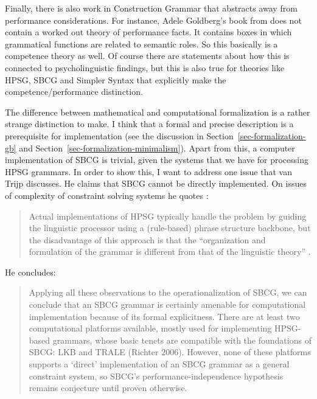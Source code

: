 Finally, there is also work in Construction Grammar that abstracts away from performance
considerations. For instance, Adele Goldberg's book from \citeyear{Goldberg95a} does
not contain a worked out theory of performance facts. It contains boxes in which grammatical
functions are related to semantic roles. So this basically is a competence theory as well. Of course
there are statements about how this is connected to psycholinguistic findings, but this is also true
for theories like HPSG, SBCG and Simpler Syntax \citep[]{Jackendoff2011a} that explicitly make the competence/performance distinction.


The difference between mathematical and computational formalization is a rather strange distinction to make. I
think that a formal and precise description is a prerequisite for implementation (see the discussion
in Section~\ref{sec-formalization-gb} and Section~\ref{sec-formalization-minimalism}). Apart from this, a computer implementation of SBCG is
trivial, given the systems that we have for processing HPSG grammars. In order to show this, I want
to address one issue that van Trijp discusses. He claims that SBCG cannot be directly
implemented. On issues of complexity of constraint solving systems he quotes \citep[Section~4.2.2]{LM2006a}:
\begin{quote}
Actual implementations of HPSG typically handle the problem by guiding the linguistic processor
using a (rule-based) phrase structure backbone, but the disadvantage of this approach is that the ``organization and formulation of the grammar is different from
that of the linguistic theory'' \citep[Section~4.2.2]{LM2006a}. \citep[]{vanTrijp2013a}
\end{quote}
\largerpage
He concludes:
\begin{quote}
Applying all these observations to the operationalization of SBCG, we can
conclude that an SBCG grammar is certainly amenable for computational implementation because of its formal explicitness. There are at least two computational
platforms available, mostly used for implementing HPSG-based grammars, whose
basic tenets are compatible with the foundations of SBCG: LKB \citep{Copestake2002a}
and TRALE (Richter 2006). However, none of these platforms supports a `direct'
implementation of an SBCG grammar as a general constraint system, so SBCG's
performance-independence hypothesis remains conjecture until proven otherwise.
\end{quote}
